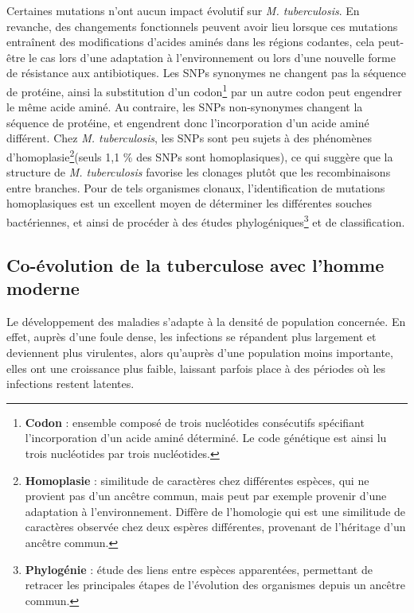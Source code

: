 \documentclass[twoside,a4paper,11pt,frenchb,openany]{report}
\begin{document}
Certaines mutations n'ont aucun impact évolutif sur \textit{M. tuberculosis}. En revanche, des changements fonctionnels peuvent avoir lieu lorsque ces mutations entraînent des modifications d'acides aminés dans les régions codantes, cela peut-être le cas lors d'une adaptation à l'environnement ou lors d'une nouvelle forme de résistance aux antibiotiques. Les SNPs synonymes ne changent pas la séquence de protéine, ainsi la substitution d'un codon\footnote{\textbf{Codon} : ensemble composé de trois nucléotides consécutifs spécifiant l'incorporation d'un acide aminé déterminé. Le code génétique est ainsi lu trois nucléotides par trois nucléotides.} par un autre codon peut engendrer le même acide aminé. Au contraire, les SNPs non-synonymes changent la séquence de protéine, et engendrent donc l'incorporation d'un acide aminé différent. Chez \textit{M. tuberculosis}, les SNPs sont peu sujets à des phénomènes d'homoplasie\footnote{\textbf{Homoplasie} : similitude de caractères chez différentes espèces, qui ne provient pas d'un ancêtre commun, mais peut par exemple provenir d'une adaptation à l'environnement. Diffère de l'homologie qui est une similitude de caractères observée chez deux espères différentes, provenant de l'héritage d'un ancêtre commun.}(seuls 1,1 \% des SNPs sont homoplasiques), ce qui suggère que la structure de \textit{M. tuberculosis} favorise les clonages plutôt que les recombinaisons entre branches. Pour de tels organismes clonaux, l'identification de mutations homoplasiques est un excellent moyen de déterminer les différentes souches bactériennes, et ainsi de procéder à des études phylogéniques\footnote{\textbf{Phylogénie} : étude des liens entre espèces apparentées, permettant de retracer les principales étapes de l'évolution des organismes depuis un ancêtre commun.} et de classification.


\subsection{Co-évolution de la tuberculose avec l'homme moderne}

Le développement des maladies s'adapte à la densité de population concernée. En effet, auprès d'une foule dense, les infections se répandent plus largement et deviennent plus virulentes, alors qu'auprès d'une population moins importante, elles ont une croissance plus faible, laissant parfois place à des périodes où les infections restent latentes.
\end{document}
